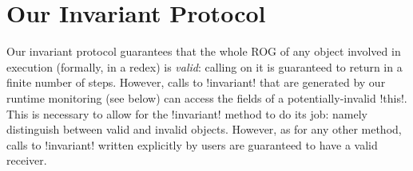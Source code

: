 \saveSpace
\section{Our Invariant Protocol}
\label{s:protocol}
\saveSpace
{}

Our invariant protocol guarantees that the whole ROG of any object involved in execution (formally, in a redex) is \emph{valid}: calling \Q@invariant@ on it is guaranteed to return \Q@true@ in a finite number of steps. However, calls to \Q!invariant! that are generated by our runtime monitoring (see below) can access the fields of a potentially-invalid \Q!this!. This is necessary to allow for the \Q!invariant! method to do its job: namely distinguish between valid and invalid objects. However, as for any other method, calls to \Q!invariant! written explicitly by users are guaranteed to have a valid receiver. 



